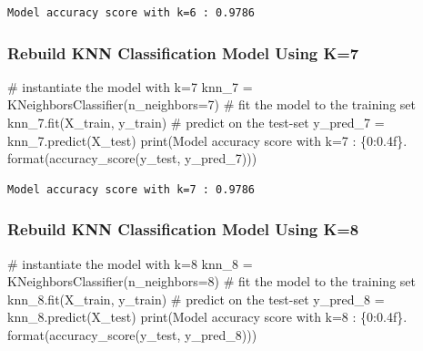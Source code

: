 \documentclass[
  letterpaper,
  DIV=11,
  numbers=noendperiod]{scrreprt}
\newenvironment{Shaded}{\begin{snugshade}}{\end{snugshade}}
\newcommand{\BuiltInTok}[1]{\textcolor[rgb]{0.00,0.23,0.31}{#1}}
\newcommand{\CommentTok}[1]{\textcolor[rgb]{0.37,0.37,0.37}{#1}}
\newcommand{\DecValTok}[1]{\textcolor[rgb]{0.68,0.00,0.00}{#1}}
\newcommand{\NormalTok}[1]{\textcolor[rgb]{0.00,0.23,0.31}{#1}}
\newcommand{\OperatorTok}[1]{\textcolor[rgb]{0.37,0.37,0.37}{#1}}
\newcommand{\SpecialCharTok}[1]{\textcolor[rgb]{0.37,0.37,0.37}{#1}}
\newcommand{\StringTok}[1]{\textcolor[rgb]{0.13,0.47,0.30}{#1}}
\begin{document}
\begin{verbatim}
Model accuracy score with k=6 : 0.9786
\end{verbatim}

\subsubsection{Rebuild KNN Classification Model Using
K=7}\label{rebuild-knn-classification-model-using-k7}

\begin{Shaded}
\begin{Highlighting}[]
\CommentTok{\# instantiate the model with k=7}
\NormalTok{knn\_7 }\OperatorTok{=}\NormalTok{ KNeighborsClassifier(n\_neighbors}\OperatorTok{=}\DecValTok{7}\NormalTok{)}
\CommentTok{\# fit the model to the training set}
\NormalTok{knn\_7.fit(X\_train, y\_train)}
\CommentTok{\# predict on the test{-}set}
\NormalTok{y\_pred\_7 }\OperatorTok{=}\NormalTok{ knn\_7.predict(X\_test)}
\BuiltInTok{print}\NormalTok{(}\StringTok{\textquotesingle{}Model accuracy score with k=7 : }\SpecialCharTok{\{0:0.4f\}}\StringTok{\textquotesingle{}}\NormalTok{. }\BuiltInTok{format}\NormalTok{(accuracy\_score(y\_test, y\_pred\_7)))}
\end{Highlighting}
\end{Shaded}

\begin{verbatim}
Model accuracy score with k=7 : 0.9786
\end{verbatim}

\subsubsection{Rebuild KNN Classification Model Using
K=8}\label{rebuild-knn-classification-model-using-k8}

\begin{Shaded}
\begin{Highlighting}[]
\CommentTok{\# instantiate the model with k=8}
\NormalTok{knn\_8 }\OperatorTok{=}\NormalTok{ KNeighborsClassifier(n\_neighbors}\OperatorTok{=}\DecValTok{8}\NormalTok{)}
\CommentTok{\# fit the model to the training set}
\NormalTok{knn\_8.fit(X\_train, y\_train)}
\CommentTok{\# predict on the test{-}set}
\NormalTok{y\_pred\_8 }\OperatorTok{=}\NormalTok{ knn\_8.predict(X\_test)}
\BuiltInTok{print}\NormalTok{(}\StringTok{\textquotesingle{}Model accuracy score with k=8 : }\SpecialCharTok{\{0:0.4f\}}\StringTok{\textquotesingle{}}\NormalTok{. }\BuiltInTok{format}\NormalTok{(accuracy\_score(y\_test, y\_pred\_8)))}
\end{Highlighting}
\end{Shaded}
\end{document}
